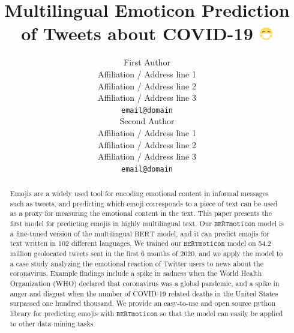 \documentclass[11pt]{article}
\title{Multilingual Emoticon Prediction of Tweets about COVID-19 \includegraphics[height=0.8em]{images/mask_photo.png}}
\author{First Author \\
  Affiliation / Address line 1 \\
  Affiliation / Address line 2 \\
  Affiliation / Address line 3 \\
  {\tt email@domain} \\\And
  Second Author \\
  Affiliation / Address line 1 \\
  Affiliation / Address line 2 \\
  Affiliation / Address line 3 \\
  {\tt email@domain} \\}
\date{}
\newcommand{\fixme}[1]{{\color{red} \textbf{FIXME:} {\textit {#1}}}}
\newcommand{\XXX}{{\textbf{XXX}}~}
\newcommand{\bertmoji}{\texttt{BERTmoticon}}
\newcommand{\bert}{\text{multilingual BERT}}
\begin{document}
\maketitle
\begin{abstract}
    Emojis are a widely used tool for encoding emotional content in informal messages such as tweets,
    and predicting which emoji corresponds to a piece of text can be used as a proxy for measuring the emotional content in the text.
    This paper presents the first model for predicting emojis in highly multilingual text.
    Our $\bertmoji$ model is a fine-tuned version of the $\bert$ model,
    and it can predict emojis for text written in 102 different languages.
    We trained our $\bertmoji$ model on 54.2 million geolocated tweets sent in the first 6 months of 2020,
    and we apply the model to a case study analyzing the emotional reaction of Twitter users to news about the coronavirus.
    Example findings include a spike in sadness when the World Health Organization (WHO) declared that coronavirus was a global pandemic,
    and a spike in anger and disgust when the number of COVID-19 related deaths in the United States surpassed one hundred thousand.
    We provide an easy-to-use and open source python library for predicting emojis with $\bertmoji$ so that the model can easily be applied to other data mining tasks.
\end{abstract}
\end{document}
